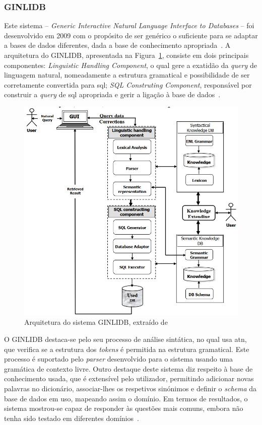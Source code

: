 \subsubsection*{GINLIDB}
Este sistema -- \textit{Generic Interactive Natural Language Interface to Databases} -- foi desenvolvido em 2009 com o propósito de ser genérico o suficiente para se adaptar a bases de dados diferentes, dada a base de conhecimento apropriada~\parencite{ginlidb}. A arquitetura do GINLIDB, apresentada na Figura~\ref{fig:ginlidb_architecture}, consiste em dois principais componentes: \textit{Linguistic Handling Component}, o qual gere a exatidão da \textit{query} de linguagem natural, nomeadamente a estrutura gramatical e possibilidade de ser corretamente convertida para \gls{sql}; \textit{SQL Construting Component}, responsável por construir a \textit{query} de \gls{sql} apropriada e gerir a ligação à base de dados~\parencite{ginlidb}.
%
\begin{figure}
    \centering
    \includegraphics[width=.9\textwidth]{ch03/assets/ginlidb_architecture.jpg}
    \caption{Arquitetura do sistema GINLIDB, extraído de~\textcite{ginlidb}}
    \label{fig:ginlidb_architecture}
\end{figure}

O GINLIDB destaca-se pelo seu processo de análise sintática, no qual usa \gls{atn}, que verifica se a estrutura dos \textit{tokens} é permitida na estrutura gramatical. Este processo é suportado pelo \textit{parser} desenvolvido para o sistema usando uma gramática de contexto livre. Outro destaque deste sistema diz respeito à base de conhecimento usada, que é extensível pelo utilizador, permitindo adicionar novas palavras no dicionário, associar-lhes os respetivos sinónimos e definir o \textit{schema} da base de dados em uso, mapeando assim o domínio. Em termos de resultados, o sistema mostrou-se capaz de responder às questões mais comuns, embora não tenha sido testado em diferentes domínios~\parencite{ginlidb}.

